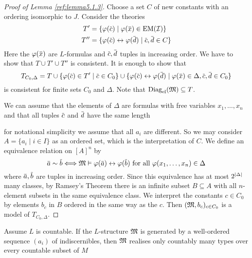 \documentclass[11pt]{article}
\begin{document}
\begin{proof}[Proof of Lemma \ref{ref:lemma5.1.3}]
Choose a set \(C\) of new constants with an ordering isomorphic to \(J\). Consider the theories
\begin{align*}
T'&=\{\varphi(\barc)\mid\varphi(\barx)\in\EM(\cali)\}\\
T''&=\{\varphi(\barc)\leftrightarrow\varphi(\bard)\mid\barc,\bard\in C\}
\end{align*}
Here the \(\varphi(\barx)\) are \(L\)-formulas and \(\barc,\bard\) tuples in increasing order. We have
to show that \(T\cup T'\cup T''\) is consistent. It is enough to show that
\begin{equation*}
T_{C_0,\Delta}=T\cup\{\varphi(\barc)\in T'\mid\barc\in C_0\}\cup\{\varphi(\barc)\leftrightarrow\varphi(\bard)\mid\varphi(\barx)\in\Delta,\barc,\bard\in C_0\}
\end{equation*}
is consistent for finite sets \(C_0\) and \(\Delta\). Note that \(\operatorname{Diag}_{\operatorname{el}}(\mathfrak{M})\subseteq T\).

We can assume that the elements of \(\Delta\) are formulas
with free variables \(x_1,\dots,x_n\) and that all tuples \(\barc\) and \(\bard\) have the same
length

for notational simplicity we assume that all \(a_i\) are different. So we may
consider \(A=\{a_i\mid i\in I\}\) as an ordered set, which is the interpretation of \(C\). We define an
equivalence relation on \([A]^n\) by
\begin{equation*}
\bara\sim\barb\Longleftrightarrow\fM\vDash\varphi(\bara)\leftrightarrow\varphi(\barb)\text{ for all }\varphi(x_1,\dots,x_n)\in\Delta
\end{equation*}
where \(\bara,\barb\) are tuples in increasing order. Since this equivalence has at
most \(2^{\abs{\Delta}}\) many classes, by Ramsey's Theorem there is an infinite subset \(B\subseteq A\) with
all \(n\)-element subsets in the same equivalence class. We interpret the constants \(c\in C_0\)
by elements \(b_c\) in \(B\) ordered in the same way as the \(c\). Then \((\mathfrak{M},b_c)_{c\in C_0}\) is
a model of \(T_{C_0,\Delta}\).
\end{proof}

\begin{lemma}[]
\label{lemma5.1.6}
Assume \(L\) is countable. If the \(L\)-structure \(\mathfrak{M}\) is generated by a well-ordered
sequence \((a_i)\) of indiscernibles, then \(\mathfrak{M}\) realises only countably many types over every
countable subset of \(M\)
\end{lemma}
\end{document}
